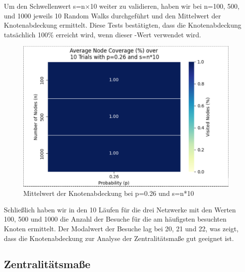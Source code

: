 Um den Schwellenwert s=n×10 weiter zu validieren, haben wir bei n=100, 500, und 1000 jeweils 10 Random Walks durchgeführt und den Mittelwert der Knotenabdeckung ermittelt. Diese Tests bestätigten, dass die Knotenabdeckung tatsächlich 100\% erreicht wird, wenn dieser -Wert verwendet wird. 

\begin{figure}
    \centering
    \includegraphics[width=\textwidth]{template/chapters/avg-coverage-p026-ntimes10.png}
    \caption{Mittelwert der Knotenabdeckung bei p=0.26 und s=n*10}
    \label{fig:avgcov}
\end{figure}

Schließlich haben wir in den 10 Läufen für die drei Netzwerke mit den Werten 100, 500 und 1000 die Anzahl der Besuche für die am häufigsten besuchten Knoten ermittelt. Der Modalwert der Besuche lag bei 20, 21 und 22, was zeigt, dass die Knotenabdeckung zur Analyse der Zentralitätsmaße gut geeignet ist.   

\subsection{Zentralitätsmaße}


